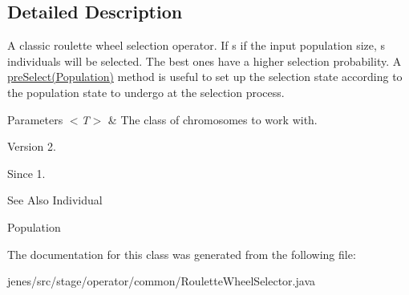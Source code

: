 \subsection{Detailed Description}
A classic roulette wheel selection operator. If s if the input population size, s individuals will be selected. The best ones have a higher selection probability. A \hyperlink{}{pre\-Select(\-Population)} method is useful to set up the selection state according to the population state to undergo at the selection process. 


\begin{DoxyParams}{Parameters}
{\em $<$\-T$>$} & The class of chromosomes to work with.\\
\hline
\end{DoxyParams}
\begin{DoxyVersion}{Version}
2. 
\end{DoxyVersion}
\begin{DoxySince}{Since}
1.
\end{DoxySince}
\begin{DoxySeeAlso}{See Also}
Individual 

Population 
\end{DoxySeeAlso}


The documentation for this class was generated from the following file\-:\begin{DoxyCompactItemize}
\item 
jenes/src/stage/operator/common/Roulette\-Wheel\-Selector.\-java\end{DoxyCompactItemize}
